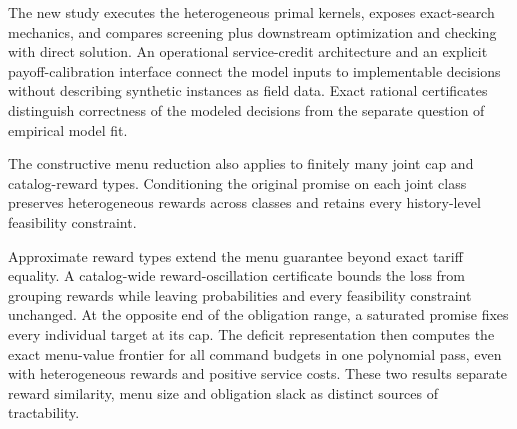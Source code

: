 The new study executes the heterogeneous primal kernels, exposes exact-search mechanics, and compares screening plus downstream optimization and checking with direct solution. An operational service-credit architecture and an explicit payoff-calibration interface connect the model inputs to implementable decisions without describing synthetic instances as field data. Exact rational certificates distinguish correctness of the modeled decisions from the separate question of empirical model fit.

The constructive menu reduction also applies to finitely many joint cap and catalog-reward types. Conditioning the original promise on each joint class preserves heterogeneous rewards across classes and retains every history-level feasibility constraint.

Approximate reward types extend the menu guarantee beyond exact tariff equality. A catalog-wide reward-oscillation certificate bounds the loss from grouping rewards while leaving probabilities and every feasibility constraint unchanged. At the opposite end of the obligation range, a saturated promise fixes every individual target at its cap. The deficit representation then computes the exact menu-value frontier for all command budgets in one polynomial pass, even with heterogeneous rewards and positive service costs. These two results separate reward similarity, menu size and obligation slack as distinct sources of tractability.
